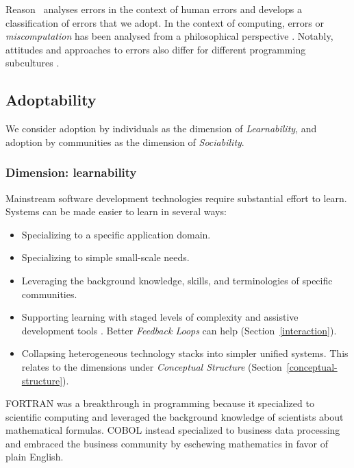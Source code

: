 \documentclass[english,submission]{programming}
\begin{document}
Reason~\cite{HumanError} analyses errors in the context of human errors
and develops a classification of errors that we adopt. In the context of
computing, errors or \emph{miscomputation} has been analysed from a
philosophical perspective \cite{Miscomputation,MalfunctioningSW}.
Notably, attitudes and approaches to errors also differ for different
programming subcultures \cite{LivingWithErrors}.

\hypertarget{adoptability}{%
\subsection{Adoptability}\label{adoptability}}


We consider adoption by individuals as the dimension of
\emph{Learnability}, and adoption by communities as the dimension of
\emph{Sociability}.

\hypertarget{dimension-learnability}{%
\subsubsection{Dimension: learnability}\label{dimension-learnability}}

Mainstream software development technologies require substantial effort
to learn. Systems can be made easier to learn in several ways:

\begin{itemize}
\tightlist
\item
  Specializing to a specific application domain.
\item
  Specializing to simple small-scale needs.
\item
  Leveraging the background knowledge, skills, and terminologies of
  specific communities.
\item
  Supporting learning with staged levels of complexity and assistive
  development tools \cite{FullBrain}. Better \emph{Feedback Loops} can
  help (Section~\ref{interaction}).
\item
  Collapsing heterogeneous technology stacks into simpler unified
  systems. This relates to the dimensions under \emph{Conceptual
  Structure} (Section~\ref{conceptual-structure}).
\end{itemize}

FORTRAN was a breakthrough in programming because it specialized to
scientific computing and leveraged the background knowledge of
scientists about mathematical formulas. COBOL instead specialized to
business data processing and embraced the business community by
eschewing mathematics in favor of plain English.
\end{document}
